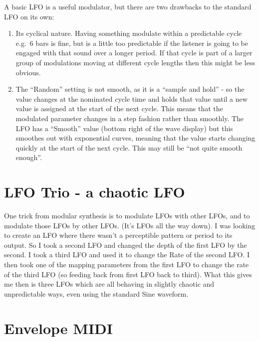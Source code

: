 \documentclass[
  12pt,
  letterpaper,
  oneside,
  open=any]{scrbook}
\makeatletter
\newcommand*\pandocbounded[1]{%
  \sbox\pandoc@box{#1}%
  \Gscale@div\@tempa{\textheight}{\dimexpr\ht\pandoc@box+\dp\pandoc@box\relax}%
  \Gscale@div\@tempb{\linewidth}{\wd\pandoc@box}%
  \ifdim\@tempb\p@<\@tempa\p@\let\@tempa\@tempb\fi%
  \ifdim\@tempa\p@<\p@\scalebox{\@tempa}{\usebox\pandoc@box}%
  \else\usebox{\pandoc@box}%
  \fi%
}
\makeatother
\begin{document}
A basic LFO is a useful modulator, but there are two drawbacks to the
standard LFO on its own:

\begin{enumerate}
\def\labelenumi{\arabic{enumi}.}
\item
  Its cyclical nature. Having something modulate within a predictable
  cycle e.g.~6 bars is fine, but is a little too predictable if the
  listener is going to be engaged with that sound over a longer period.
  If that cycle is part of a larger group of modulations moving at
  different cycle lengths then this might be less obvious.
\item
  The ``Random'' setting is not smooth, as it is a ``sample and hold'' -
  so the value changes at the nominated cycle time and holds that value
  until a new value is assigned at the start of the next cycle. This
  means that the modulated parameter changes in a step fashion rather
  than smoothly. The LFO has a ``Smooth'' value (bottom right of the
  wave display) but this smoothes out with exponential curves, meaning
  that the value starts changing quickly at the start of the next cycle.
  This may still be ``not quite smooth enough''.
\end{enumerate}

\section{LFO Trio - a chaotic LFO}\label{lfo-trio---a-chaotic-lfo}

One trick from modular synthesis is to modulate LFOs with other LFOs,
and to modulate those LFOs by other LFOs. (It's LFOs all the way down).
I was looking to create an LFO where there wasn't a perceptible pattern
or period to its output. So I took a second LFO and changed the depth of
the first LFO by the second. I took a third LFO and used it to change
the Rate of the second LFO. I then took one of the mapping parameters
from the first LFO to change the rate of the third LFO (so feeding back
from first LFO back to third). What this gives me then is three LFOs
which are all behaving in slightly chaotic and unpredictable ways, even
using the standard Sine waveform.

\pandocbounded{\texttt{[image: images/Chaotic\_LFOs.png]}}

\section{Envelope MIDI}\label{envelope-midi}
\end{document}
